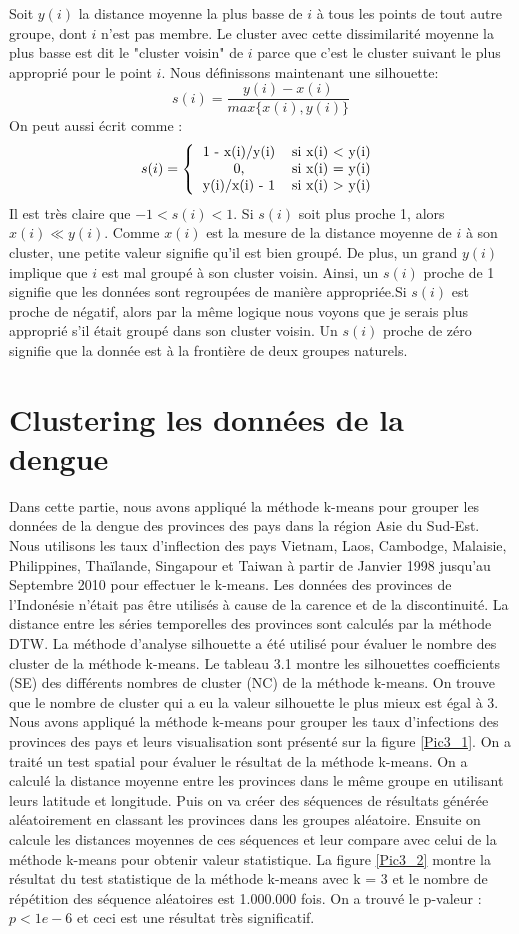 Soit $y(i)$ la distance moyenne la plus basse de $i$ à tous les points de tout autre groupe, dont $i$ n'est pas membre. Le cluster avec cette dissimilarité moyenne la plus basse est dit le "cluster voisin" de $i$ parce que c'est le cluster suivant le plus approprié pour le point $i$. Nous définissons maintenant une silhouette: 
$$s(i) = \frac{y(i) - x(i)}{max\{ x(i), y(i)\}}$$
On peut aussi écrit comme : 
$$s(i) = \left\{ 
\begin {tabular}{c c}
1 - x(i)/y(i) & si x(i) < y(i) \\
0, & si x(i) = y(i)\\
y(i)/x(i) - 1 & si x(i) > y(i)
\end{tabular}
\right.$$
Il est très claire que $-1 < s(i) < 1$. Si $s(i)$ soit plus proche 1, alors $x(i)\ll y(i)$. Comme $x(i)$ est la mesure de la distance moyenne de $i$  à son cluster, une petite valeur signifie qu'il est bien groupé. De plus, un grand $y(i)$ implique que $i$ est mal groupé à son cluster voisin. Ainsi, un $s(i)$ proche de 1 signifie que les données sont regroupées de manière appropriée.Si $s(i)$ est proche de négatif, alors par la même logique nous voyons que je serais plus approprié s'il était groupé dans son cluster voisin. Un $s(i)$ proche de zéro signifie que la donnée est à la frontière de deux groupes naturels. 
\section{Clustering les données de la dengue}
Dans cette partie, nous avons appliqué la méthode k-means pour grouper les données de la dengue des provinces des pays dans la région Asie du Sud-Est. Nous utilisons les taux d'inflection des pays Vietnam, Laos, Cambodge, Malaisie, Philippines, Thaïlande, Singapour et Taiwan à partir de Janvier 1998 jusqu'au Septembre 2010 pour effectuer le k-means. Les données des provinces de l'Indonésie n'était  pas  être utilisés à cause de la carence et de la discontinuité. La distance entre les séries temporelles des provinces sont calculés par la méthode DTW. La méthode d'analyse silhouette a été utilisé pour évaluer le nombre des cluster de la méthode k-means. Le tableau 3.1 montre les silhouettes coefficients (SE) des différents nombres de cluster (NC) de la méthode k-means. On trouve que le nombre de cluster qui a eu la valeur silhouette le plus mieux est égal à 3. Nous avons appliqué la méthode k-means pour grouper les taux d'infections des provinces des pays et leurs visualisation sont présenté sur la figure \ref{Pic3_1}.  On a traité un test spatial pour évaluer le résultat de la méthode k-means. On a calculé la distance moyenne entre les provinces dans le même groupe en utilisant leurs latitude et longitude. Puis on va créer des séquences de résultats générée aléatoirement en classant les provinces dans les groupes aléatoire. Ensuite on calcule les distances moyennes de ces séquences et leur compare avec celui de la méthode k-means pour obtenir valeur statistique. La figure \ref{Pic3_2} montre la résultat du test statistique de la méthode k-means avec k = 3 et le nombre de répétition des séquence aléatoires est 1.000.000 fois. On a trouvé le p-valeur : $p < 1e-6$ et ceci est une résultat très significatif.

